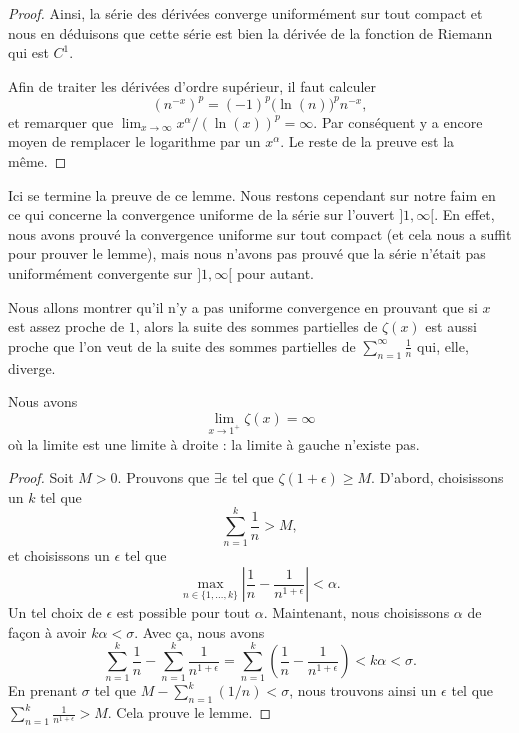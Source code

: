 \begin{proof}
	Ainsi, la série des dérivées converge uniformément sur tout compact et nous en déduisons que cette série est bien la dérivée de la fonction de Riemann qui est \( C^1\).

	Afin de traiter les dérivées d'ordre supérieur, il faut calculer
	\begin{equation}
		(n^{-x})^{p}=(-1)^p\big( \ln(n) \big)^p n^{-x},
	\end{equation}
	et remarquer que \( \lim_{x\to\infty} x^{\alpha}/(\ln(x))^p=\infty\). Par conséquent y a encore moyen de remplacer le logarithme par un \( x^{\alpha}\). Le reste de la preuve est la même.
\end{proof}

Ici se termine la preuve de ce lemme. Nous restons cependant sur notre faim en ce qui concerne la convergence uniforme de la série sur l'ouvert \( ]1,\infty[\). En effet, nous avons prouvé la convergence uniforme sur tout compact (et cela nous a suffit pour prouver le lemme), mais nous n'avons pas prouvé que la série n'était pas uniformément convergente sur \( ]1,\infty[\) pour autant.

	Nous allons montrer qu'il n'y a pas uniforme convergence en prouvant que si \( x\) est assez proche de \( 1\), alors la suite des sommes partielles de \( \zeta(x)\) est aussi proche que l'on veut de la suite des sommes partielles de \( \sum_{n=1}^{\infty}\frac{1}{ n }\) qui, elle, diverge.

	\begin{lemma}
		Nous avons
		\begin{equation}
			\lim_{x\to 1^+}\zeta(x)=\infty
		\end{equation}
		où la limite est une limite à droite : la limite à gauche n'existe pas.
	\end{lemma}

	\begin{proof}
		Soit \( M>0\). Prouvons que \( \exists\epsilon\) tel que \( \zeta(1+\epsilon)\geq M\). D'abord, choisissons un \( k\) tel que
		\begin{equation}
			\sum_{n=1}^k\frac{1}{ n }>M,
		\end{equation}
		et choisissons un \( \epsilon\) tel que
		\begin{equation}
			\max_{n\in\{ 1,\ldots,k \}}\left|  \frac{1}{ n }-\frac{1}{ n^{1+\epsilon} }\right|<\alpha.
		\end{equation}
		Un tel choix de \( \epsilon\) est possible pour tout \( \alpha\). Maintenant, nous choisissons \( \alpha\) de façon à avoir \( k\alpha<\sigma\). Avec ça, nous avons
		\begin{equation}
			\sum_{n=1}^k\frac{1}{ n }-\sum_{n=1}^k\frac{1}{ n^{1+\epsilon} }=\sum_{n=1}^k\left( \frac{1}{ n }-\frac{1}{ n^{1+\epsilon} } \right)<k\alpha<\sigma.
		\end{equation}
		En prenant \( \sigma\) tel que \( M-\sum_{n=1}^k(1/n)<\sigma\), nous trouvons ainsi un \( \epsilon\) tel que \( \sum_{n=1}^k\frac{1}{ n^{1+\epsilon} }>M\). Cela prouve le lemme.
	\end{proof}

